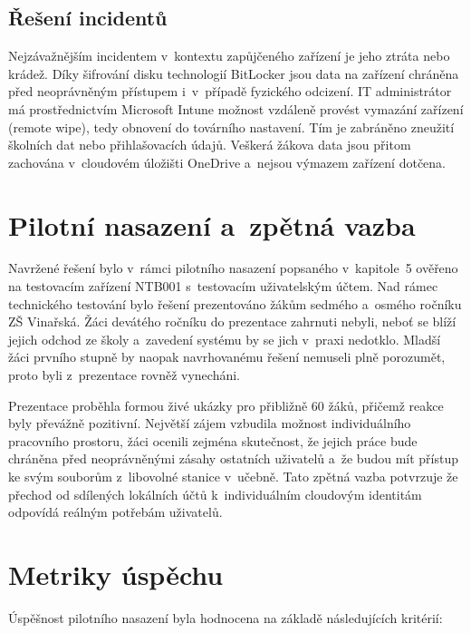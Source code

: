\documentclass[male,czech,api_bc]{kitheses}
\begin{document}
\subsection{Řešení incidentů}

Nejzávažnějším incidentem v~kontextu zapůjčeného zařízení je jeho ztráta 
nebo krádež. Díky šifrování disku technologií BitLocker jsou data na 
zařízení chráněna před neoprávněným přístupem i~v~případě fyzického 
odcizení. IT administrátor má prostřednictvím Microsoft Intune možnost vzdáleně provést vymazání zařízení (remote wipe), tedy obnovení do továrního nastavení. 
Tím je zabráněno zneužití školních dat nebo 
přihlašovacích údajů. Veškerá žákova data jsou přitom zachována 
v~cloudovém úložišti OneDrive a~nejsou výmazem zařízení dotčena.

\section{Pilotní nasazení a~zpětná vazba}

Navržené řešení bylo v~rámci pilotního nasazení popsaného v~kapitole~5 
ověřeno na testovacím zařízení NTB001 s~testovacím uživatelským účtem. 
Nad rámec technického testování bylo řešení prezentováno žákům sedmého 
a~osmého ročníku ZŠ Vinařská. Žáci devátého ročníku do prezentace 
zahrnuti nebyli, neboť se blíží jejich odchod ze školy a~zavedení 
systému by se jich v~praxi nedotklo. Mladší žáci prvního stupně by 
naopak navrhovanému řešení nemuseli plně porozumět, proto byli 
z~prezentace rovněž vynecháni.

Prezentace proběhla formou živé ukázky pro přibližně 60 žáků, přičemž reakce byly převážně pozitivní. 
Největší zájem vzbudila možnost individuálního pracovního prostoru, žáci ocenili 
zejména skutečnost, že jejich práce bude chráněna před neoprávněnými 
zásahy ostatních uživatelů a~že budou mít přístup ke svým souborům 
z~libovolné stanice v~učebně. Tato zpětná vazba potvrzuje že přechod 
od sdílených lokálních účtů k~individuálním cloudovým identitám odpovídá 
reálným potřebám uživatelů.

\section{Metriky úspěchu}

Úspěšnost pilotního nasazení byla hodnocena na základě následujících 
kritérií:
\end{document}
